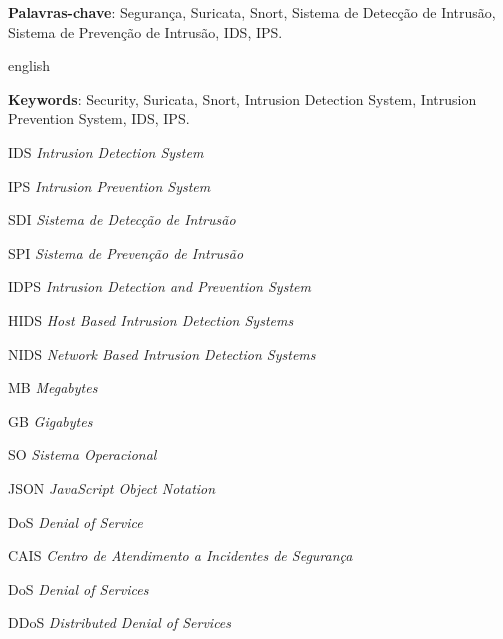 \documentclass[
	12pt,				
	openright,		
	twoside,	
	a4paper,
	english,	
	brazil	
	]{abntex2}
\begin{document}
\setlength{\absparsep}{18pt} 

\begin{resumo}
 \textbf{Palavras-chave}: Segurança, Suricata, Snort, Sistema de Detecção de Intrusão, Sistema de Prevenção de Intrusão, IDS, IPS.
\end{resumo}

\begin{resumo}[Abstract]
 \begin{otherlanguage*}{english}
   \vspace{\onelineskip}
 
   \noindent 
   \textbf{Keywords}: Security, Suricata, Snort, Intrusion Detection System, Intrusion Prevention System, IDS, IPS.
 \end{otherlanguage*}
\end{resumo}

\listoffigures*
\cleardoublepage
{}
\listoftables*
\cleardoublepage

\begin{siglas}
  \item[IDS] \textit{Intrusion Detection System}
  \item[IPS] \textit{Intrusion Prevention System}
  \item[SDI] \textit{Sistema de Detecção de Intrusão}
  \item[SPI] \textit{Sistema de Prevenção de Intrusão}
  \item[IDPS] \textit{Intrusion Detection and Prevention System}
  \item[HIDS] \textit{Host Based Intrusion Detection Systems}
  \item[NIDS] \textit{Network Based Intrusion Detection Systems}
  \item[MB] \textit{Megabytes}
  \item[GB] \textit{Gigabytes}
  \item[SO] \textit{Sistema Operacional}
  \item[JSON] \textit{JavaScript Object Notation}
  \item[DoS] \textit{Denial of Service}
  \item[CAIS] \textit{Centro de Atendimento a Incidentes de Segurança}
  \item[DoS] \textit{Denial of Services}
  \item[DDoS] \textit{Distributed Denial of Services}
\end{siglas}

\tableofcontents*
\cleardoublepage
\textual
\end{document}
